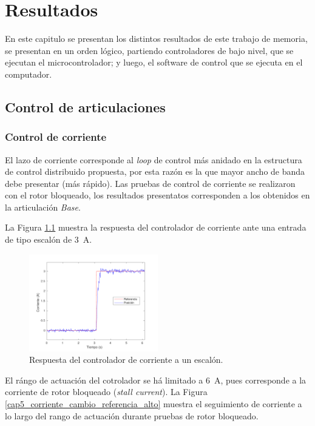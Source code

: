 \chapter{Resultados}

En este capitulo se presentan los distintos resultados de este trabajo de memoria, se presentan en un orden lógico, partiendo controladores de bajo nivel, que se ejecutan el microcontrolador; y luego, el software de control que se ejecuta en el computador.

\section{Control de articulaciones}

\subsection{Control de corriente}

El lazo de corriente corresponde al \textit{loop} de control más anidado en la estructura de control distribuido propuesta, por esta razón es la que mayor ancho de banda debe presentar (más rápido). Las pruebas de control de corriente se realizaron con el rotor bloqueado, los resultados presentatos corresponden a los obtenidos en la articulación \textit{Base}.

La Figura \ref{cap5_step_corriente} muestra la respuesta del controlador de corriente ante una entrada de tipo escalón de \SI{3}{\ampere}.

\begin{figure}[h]
  \centering
  \includegraphics[width=0.5\textwidth]{img/cap5/step_corriente.pdf}
  \caption{Respuesta del controlador de corriente a un escalón.}
  \label{cap5_step_corriente}
\end{figure}

El rángo de actuación del cotrolador se há limitado a \SI{6}{\ampere}, pues corresponde a la corriente de rotor bloqueado (\textit{stall current}). La Figura \ref{cap5_corriente_cambio_referencia_alto} muestra el seguimiento de corriente a lo largo del rango de actuación durante pruebas de rotor bloqueado.

